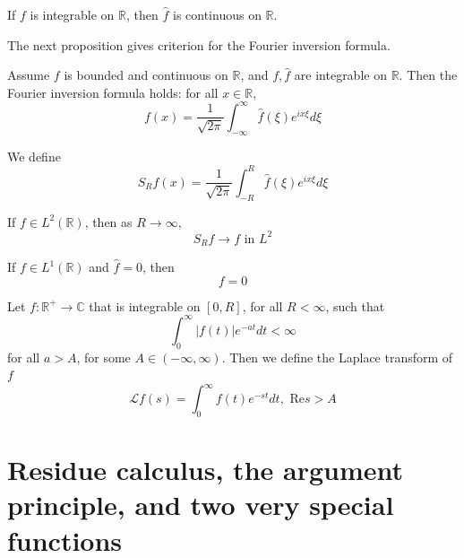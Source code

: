\documentclass[openany]{book}
\newcommand{\R}{\mathbb{R}}
\newcommand{\C}{\mathbb{C}}
\begin{document}
\begin{prop}
    If $f$ is integrable on $\R$, then $\hat{f}$ is continuous on $\R$.
\end{prop}
The next proposition gives criterion for the Fourier inversion formula.
\begin{prop}
    Assume $f$ is bounded and continuous on $\R$, and $f,\hat{f}$ are integrable on $\R$. Then the Fourier inversion formula holds: for all $x\in\R$,
    \begin{equation*}
        f(x)=\frac{1}{\sqrt{2\pi}}\int_{-\infty}^\infty\hat{f}(\xi)e^{ix\xi}d\xi
    \end{equation*}
\end{prop}
We define 
\begin{equation*}
    S_Rf(x)=\frac{1}{\sqrt{2\pi}}\int_{-R}^R\hat{f}(\xi)e^{ix\xi}d\xi
\end{equation*}
\begin{prop}
    If $f\in L^2(\R)$, then as $R\to\infty$,
    \begin{equation*}
        S_Rf\to f \text{ in } L^2
    \end{equation*}
\end{prop}


\begin{prop}[uniqueness]
    If $f\in L^1(\R)$ and $\hat{f}=0$, then 
    \begin{equation*}
        f=0
    \end{equation*}
\end{prop}


\begin{defn}
    Let $f:\R^+\to\C$ that is integrable on $[0,R]$, for all $R<\infty$, such that 
    \begin{equation*}
        \int_0^\infty|f(t)|e^{-at}dt<\infty
    \end{equation*}
    for all $a>A$, for some $A\in(-\infty,\infty)$. Then we define the Laplace transform of $f$ 
    \begin{equation*}
        \mathcal{L}f(s)=\int_0^\infty f(t)e^{-st}dt, \text{ Re} s>A
    \end{equation*}
\end{defn}





\chapter{Residue calculus, the argument principle, and two very special
functions}
\end{document}
